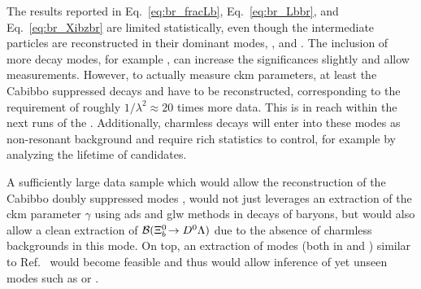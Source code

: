 The results reported in Eq.~\eqref{eq:br_fracLb}, Eq.~\eqref{eq:br_Lbbr}, and Eq.~\eqref{eq:br_Xibzbr} are limited statistically, even though the intermediate particles are reconstructed in their dominant modes, \ie{}, \decay{\Dz}{\Km\pip} and \decay{\Lz}{\proton\pim}.
The inclusion of more decay modes, for example \decay{\Dz}{\Km\pip\pip\pim}, can increase the significances slightly and allow \CP measurements.
However, to actually measure \gls{ckm} parameters, at least the Cabibbo suppressed decays \decay{\Dz}{\Km\Kp} and \decay{\Dz}{\pim\pip} have to be reconstructed, corresponding to the requirement of roughly $1 / \lambda^2 \approx 20$ times more data.
This is in reach within the next runs of the \lhc.
Additionally, charmless \Lb decays will enter into these modes as non-resonant background and require rich statistics to control, for example by analyzing the lifetime of \Dz candidates.

A sufficiently large data sample which would allow the reconstruction of the Cabibbo doubly suppressed modes \decay{\Dz}{\Kp\pim}, would not just leverages an extraction of the \gls{ckm} parameter $\gamma$ using \gls{ads} and \gls{glw} methods in decays of baryons, but would also allow a clean extraction of ${\mathcal{B}}({{\Xi}^0_{b}}\!\rightarrow {\ensuremath{{D}^0}}{\ensuremath{\Lambda}})$ due to the absence of charmless backgrounds in this mode.
On top, an extraction of \Sz modes (both in \Lb and \Xibz) similar to Ref.~\cite{IsospinInLbToJpsiLz} would become feasible and thus would allow inference of yet unseen modes such as \decay{\Xibz}{\Dz\Xiz} or \decay{\Lb}{\Dz\neutron}.
